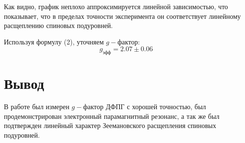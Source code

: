 \documentclass[a4paper, 14pt]{extarticle}%
\begin{document}
Как видно, график неплохо аппроксимируется линейной зависимостью, что показывает, что в пределах точности эксперимента он соответствует линейному расщеплению спиновых подуровней.

Используя формулу (2), уточняем $g-$фактор:
\[g_{\text{эфф}} = 2.07\pm0.06\]

\newpage

\section*{Вывод}

В работе был измерен $g-$фактор ДФПГ с хорошей точностью, был продемонстрирован электронный парамагнитный резонанс, а так же был подтвержден линейный характер Зеемановского расщепления спиновых подуровней.
\end{document}
